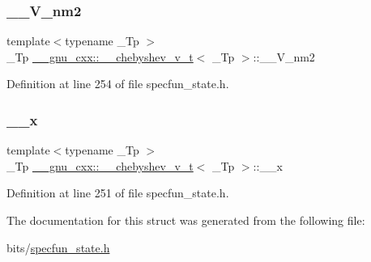 \subsubsection{\texorpdfstring{\+\_\+\+\_\+\+V\+\_\+nm2}{\_\_V\_nm2}}
{\footnotesize\ttfamily template$<$typename \+\_\+\+Tp $>$ \\
\+\_\+\+Tp \hyperlink{struct____gnu__cxx_1_1____chebyshev__v__t}{\+\_\+\+\_\+gnu\+\_\+cxx\+::\+\_\+\+\_\+chebyshev\+\_\+v\+\_\+t}$<$ \+\_\+\+Tp $>$\+::\+\_\+\+\_\+\+V\+\_\+nm2}



Definition at line 254 of file specfun\+\_\+state.\+h.

\mbox{\label{struct____gnu__cxx_1_1____chebyshev__v__t_a58e22482d8e79ded483fa4816e959a5c}} 
\subsubsection{\texorpdfstring{\+\_\+\+\_\+x}{\_\_x}}
{\footnotesize\ttfamily template$<$typename \+\_\+\+Tp $>$ \\
\+\_\+\+Tp \hyperlink{struct____gnu__cxx_1_1____chebyshev__v__t}{\+\_\+\+\_\+gnu\+\_\+cxx\+::\+\_\+\+\_\+chebyshev\+\_\+v\+\_\+t}$<$ \+\_\+\+Tp $>$\+::\+\_\+\+\_\+x}



Definition at line 251 of file specfun\+\_\+state.\+h.



The documentation for this struct was generated from the following file\+:\begin{DoxyCompactItemize}
\item 
bits/\hyperlink{specfun__state_8h}{specfun\+\_\+state.\+h}\end{DoxyCompactItemize}
